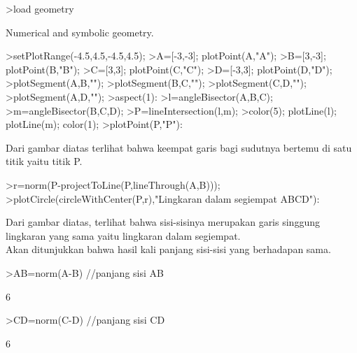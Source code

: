 \documentclass[a4paper,10pt]{article}
\begin{document}
\begin{eulernotebook}
\begin{eulercomment}
\begin{eulercomment}
\begin{eulercomment}
\begin{eulercomment}
\begin{eulercomment}
\begin{eulercomment}
\begin{eulercomment}
\begin{eulercomment}
\begin{eulercomment}
\begin{eulercomment}
\begin{eulercomment}
\begin{eulercomment}
\begin{eulercomment}
\begin{eulercomment}
\begin{eulercomment}
\begin{eulercomment}
\begin{eulercomment}
\begin{eulercomment}
\begin{eulercomment}
\begin{eulercomment}
\begin{eulercomment}
\begin{eulercomment}
\begin{eulercomment}
\begin{eulercomment}
\begin{eulercomment}
\begin{eulercomment}
\begin{eulercomment}
\begin{eulercomment}
\begin{eulercomment}
\begin{eulercomment}
\begin{eulerprompt}
>load geometry
\end{eulerprompt}
\begin{euleroutput}
  Numerical and symbolic geometry.
\end{euleroutput}
\begin{eulerprompt}
>setPlotRange(-4.5,4.5,-4.5,4.5);
>A=[-3,-3]; plotPoint(A,"A");
>B=[3,-3]; plotPoint(B,"B");
>C=[3,3]; plotPoint(C,"C");
>D=[-3,3]; plotPoint(D,"D");
>plotSegment(A,B,"");
>plotSegment(B,C,"");
>plotSegment(C,D,"");
>plotSegment(A,D,"");
>aspect(1):
>l=angleBisector(A,B,C);
>m=angleBisector(B,C,D);
>P=lineIntersection(l,m);
>color(5); plotLine(l); plotLine(m); color(1);
>plotPoint(P,"P"):
\end{eulerprompt}
\begin{eulercomment}
Dari gambar diatas terlihat bahwa keempat garis bagi sudutnya bertemu
di satu titik yaitu titik P.
\end{eulercomment}
\begin{eulerprompt}
>r=norm(P-projectToLine(P,lineThrough(A,B)));
>plotCircle(circleWithCenter(P,r),"Lingkaran dalam segiempat ABCD"):
\end{eulerprompt}
\begin{eulercomment}
Dari gambar diatas, terlihat bahwa sisi-sisinya merupakan garis
singgung lingkaran yang sama yaitu lingkaran dalam segiempat.\\
Akan ditunjukkan bahwa hasil kali panjang sisi-sisi yang berhadapan
sama.
\end{eulercomment}
\begin{eulerprompt}
>AB=norm(A-B) //panjang sisi AB
\end{eulerprompt}
\begin{euleroutput}
  6
\end{euleroutput}
\begin{eulerprompt}
>CD=norm(C-D) //panjang sisi CD
\end{eulerprompt}
\begin{euleroutput}
  6
\end{euleroutput}

\end{eulercomment}
\end{eulercomment}
\end{eulercomment}
\end{eulercomment}
\end{eulercomment}
\end{eulercomment}
\end{eulercomment}
\end{eulercomment}
\end{eulercomment}
\end{eulercomment}
\end{eulercomment}
\end{eulercomment}
\end{eulercomment}
\end{eulercomment}
\end{eulercomment}
\end{eulercomment}
\end{eulercomment}
\end{eulercomment}
\end{eulercomment}
\end{eulercomment}
\end{eulercomment}
\end{eulercomment}
\end{eulercomment}
\end{eulercomment}
\end{eulercomment}
\end{eulercomment}
\end{eulercomment}
\end{eulercomment}
\end{eulercomment}
\end{eulercomment}
\end{eulernotebook}
\end{document}
